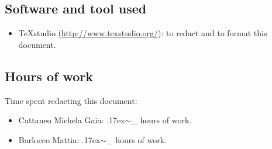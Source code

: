 \documentclass[18pt,oneside,a4paper, titlepage]{article}
\begin{document}
	\subsection{Software and tool used}
		\begin{itemize}
			\item TeXstudio (\url{http://www.texstudio.org/}): to redact and to format this document.
		\end{itemize}
	
	\subsection{Hours of work}
		Time spent redacting this document:
		\begin{itemize}
			\item Cattaneo Michela Gaia: {\raise.17ex\hbox{$\scriptstyle\sim$}}\_ hours of work.
			\item Barlocco Mattia: {\raise.17ex\hbox{$\scriptstyle\sim$}}\_ hours of work.
		\end{itemize}
\end{document}
